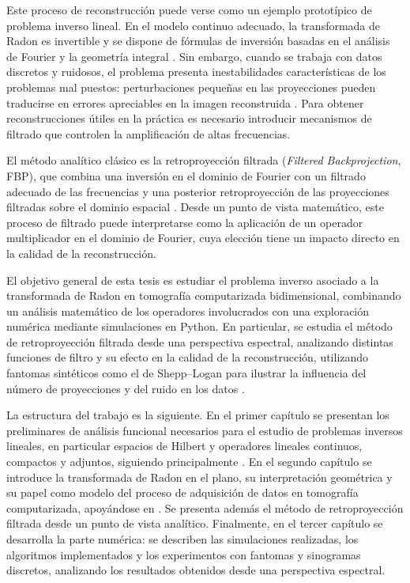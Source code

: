 Este proceso de reconstrucción puede verse como un ejemplo prototípico de problema inverso lineal. En el modelo continuo adecuado, la transformada de Radon es invertible y se dispone de fórmulas de inversión basadas en el análisis de Fourier y la geometría integral \cite{helgason2011,kuchment2014}. Sin embargo, cuando se trabaja con datos discretos y ruidosos, el problema presenta inestabilidades características de los problemas mal puestos: perturbaciones pequeñas en las proyecciones pueden traducirse en errores apreciables en la imagen reconstruida \cite{kirsch2011,natterer2001}. Para obtener reconstrucciones útiles en la práctica es necesario introducir mecanismos de filtrado que controlen la amplificación de altas frecuencias.

El método analítico clásico es la retroproyección filtrada (\emph{Filtered Backprojection}, FBP), que combina una inversión en el dominio de Fourier con un filtrado adecuado de las frecuencias y una posterior retroproyección de las proyecciones filtradas sobre el dominio espacial \cite{kak_slaney1988,natterer2001}. Desde un punto de vista matemático, este proceso de filtrado puede interpretarse como la aplicación de un operador multiplicador en el dominio de Fourier, cuya elección tiene un impacto directo en la calidad de la reconstrucción.

El objetivo general de esta tesis es estudiar el problema inverso asociado a la transformada de Radon en tomografía computarizada bidimensional, combinando un análisis matemático de los operadores involucrados con una exploración numérica mediante simulaciones en Python. En particular, se estudia el método de retroproyección filtrada desde una perspectiva espectral, analizando distintas funciones de filtro y su efecto en la calidad de la reconstrucción, utilizando fantomas sintéticos como el de Shepp--Logan para ilustrar la influencia del número de proyecciones y del ruido en los datos \cite{shepp_logan1974}.

La estructura del trabajo es la siguiente. En el primer capítulo se presentan los preliminares de análisis funcional necesarios para el estudio de problemas inversos lineales, en particular espacios de Hilbert y operadores lineales continuos, compactos y adjuntos, siguiendo principalmente \cite{kirsch2011,rynne_youngson2000}. En el segundo capítulo se introduce la transformada de Radon en el plano, su interpretación geométrica y su papel como modelo del proceso de adquisición de datos en tomografía computarizada, apoyándose en \cite{radon1917,kak_slaney1988,natterer2001,kuchment2014}. Se presenta además el método de retroproyección filtrada desde un punto de vista analítico. Finalmente, en el tercer capítulo se desarrolla la parte numérica: se describen las simulaciones realizadas, los algoritmos implementados y los experimentos con fantomas y sinogramas discretos, analizando los resultados obtenidos desde una perspectiva espectral.